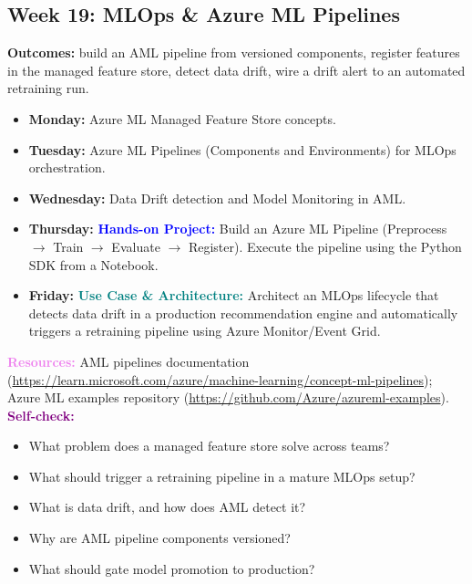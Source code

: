 \documentclass[11pt, a4paper]{article}
\newcommand{\project}[1]{\vspace{1mm}\noindent\textbf{\textcolor{blue}{Hands-on Project:}} #1}
\newcommand{\usecase}[1]{\vspace{1mm}\noindent\textbf{\textcolor{teal}{Use Case \& Architecture:}} #1}
\newcommand{\dayitem}[2]{\item \textbf{#1:} #2}
\newcommand{\resources}[1]{\vspace{1mm}\noindent\textbf{\textcolor{violet}{Resources:}} #1}
\newcommand{\selfcheck}[1]{\vspace{1mm}\noindent\textbf{\textcolor{purple}{Self-check:}} #1}
\begin{document}
\subsection*{Week 19: MLOps \& Azure ML Pipelines}
\par\noindent\textbf{Outcomes:} build an AML pipeline from versioned components, register features in the managed feature store, detect data drift, wire a drift alert to an automated retraining run.
\begin{itemize}[label=-]
    \dayitem{Monday}{Azure ML Managed Feature Store concepts.}
    \dayitem{Tuesday}{Azure ML Pipelines (Components and Environments) for MLOps orchestration.}
    \dayitem{Wednesday}{Data Drift detection and Model Monitoring in AML.}
    \dayitem{Thursday}{\project{Build an Azure ML Pipeline (Preprocess $\rightarrow$ Train $\rightarrow$ Evaluate $\rightarrow$ Register). Execute the pipeline using the Python SDK from a Notebook.}}
    \dayitem{Friday}{\usecase{Architect an MLOps lifecycle that detects data drift in a production recommendation engine and automatically triggers a retraining pipeline using Azure Monitor/Event Grid.}}
\end{itemize}
\resources{AML pipelines documentation (\url{https://learn.microsoft.com/azure/machine-learning/concept-ml-pipelines}); Azure ML examples repository (\url{https://github.com/Azure/azureml-examples}).}
\selfcheck{\begin{itemize}[label=-, itemsep=0pt]
    \item What problem does a managed feature store solve across teams?
    \item What should trigger a retraining pipeline in a mature MLOps setup?
    \item What is data drift, and how does AML detect it?
    \item Why are AML pipeline components versioned?
    \item What should gate model promotion to production?
\end{itemize}}
\end{document}
